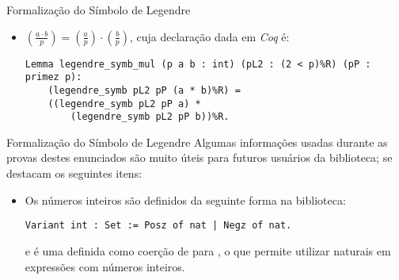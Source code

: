 \begin{frame}[fragile]{Formalização do Símbolo de Legendre}

    \begin{itemize}
        \item $\left(\frac{a \cdot b}{p}\right) = \left(\frac{a}{p}\right) \cdot \left(\frac{b}{p}\right)$, cuja declaração dada em \textit{Coq} é:
        \newline
            \begin{lstlisting}[language=coq,frame=single,tabsize=1]
Lemma legendre_symb_mul (p a b : int) (pL2 : (2 < p)%R) (pP : primez p):
    (legendre_symb pL2 pP (a * b)%R) = 
    ((legendre_symb pL2 pP a) * 
        (legendre_symb pL2 pP b))%R.
            \end{lstlisting}
    \end{itemize}

\end{frame}

\begin{frame}[fragile]{Formalização do Símbolo de Legendre}
    Algumas informações usadas durante as provas destes enunciados são muito úteis para futuros usuários da biblioteca; se destacam os seguintes itens:
    \begin{itemize}
        \item Os números inteiros são definidos da seguinte forma na biblioteca:
            \begin{lstlisting}[language=coq,frame=single,tabsize=1]
Variant int : Set := Posz of nat | Negz of nat.
            \end{lstlisting}
        e  é uma definida como coerção de  para , o que permite utilizar naturais em expressões com números inteiros.

        
    \end{itemize}
\end{frame}

